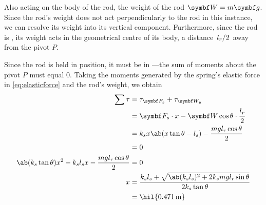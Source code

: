 Also acting on the body of the rod, the weight of the rod \(\mv{W} =
m\mv{g}\). Since
the rod's weight does not act perpendicularly to the rod in this instance, we
can resolve its weight into its vertical component. Furthermore, since the rod
is , its weight acts in the geometrical centre of its
body, a distance \(\lf{l_r}{2}\)
away from the pivot \(P\).

Since the rod is held in position, it must be in ---the
sum of moments about the pivot \(P\) must equal \(0\).
Taking the moments generated by the spring's elastic force in
\cref{eq:elasticforce} and the rod's weight, we obtain
\begin{align*}
  \sum\tau &= \tau_{\mv{F}_s} + \tau_{\mv{W}_y} \\
  &= \mv{F}_s\cdot x - \mv{W}\cos\theta\cdot\f{l_r}{2} \\
  &= k_sx\ab(x\tan\theta - l_s) - \f{mgl_r\cos\theta}{2} \\
  &= 0 \\
  \ab(k_s\tan\theta)x^2 - k_sl_sx -\f{mgl_r\cos\theta}{2} &= 0\\
  x&= \f{k_sl_s + \sqrt{\ab(k_sl_s)^2 + 2k_smgl_r\sin\theta}}{2k_s\tan\theta} \\
  &= \hil{\qty{0.471}{\metre}}
\end{align*}

